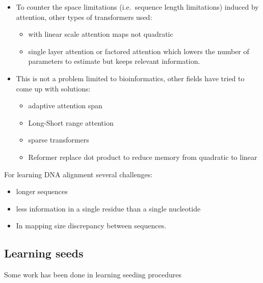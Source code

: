 \documentclass[
  11pt,
  twoside,
  BCOR=10mm,
  listof=totoc]{scrbook}
\begin{document}
\begin{itemize}
\item
  To counter the space limitations (i.e.~sequence length limitations) induced by attention, other types of transformers used:

  \begin{itemize}
  \item
    with linear scale attention maps not quadratic \autocite{choromanskiMaskedLanguageModeling2020}
  \item
    single layer attention or factored attention \autocite{bhattacharyaInterpretingPottsTransformer2021} which lowers the number of parameters to estimate but keeps relevant information.
  \end{itemize}
\item
  This is not a problem limited to bioinformatics, other fields have tried to come up with solutions:

  \begin{itemize}
  \item
    adaptive attention span \autocite{sukhbaatarAdaptiveAttentionSpan2019}
  \item
    Long-Short range attention \autocite{wuLiteTransformerLongShort2020}
  \item
    sparse transformers \autocite{childGeneratingLongSequences2019,correiaAdaptivelySparseTransformers2019}
  \item
    Reformer replace dot product to reduce memory from quadratic to linear \autocite{kitaevReformerEfficientTransformer2020}
  \end{itemize}
\end{itemize}

For learning DNA alignment several challenges:

\begin{itemize}
\item
  longer sequences
\item
  less information in a single residue than a single nucleotide
\item
  In mapping size discrepancy between sequences.
\end{itemize}

\hypertarget{learning-seeds}{%
\subsection{Learning seeds}\label{learning-seeds}}

Some work has been done in learning seeding procedures
\end{document}
